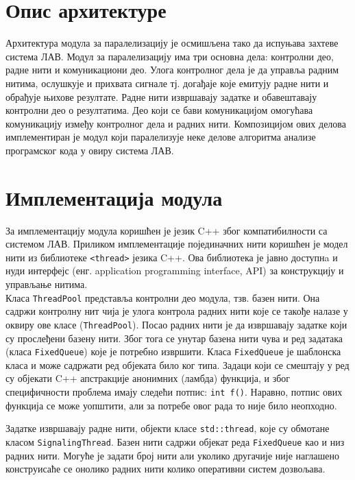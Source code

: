 \documentclass[12pt,oneside]{memoir}
\begin{document}
\section{Опис архитектуре}

Архитектура модула за паралелизацију је осмишљена тако да испуњава захтеве система ЛАВ. Модул за паралелизацију има три основна дела: контролни део, радне нити и комуникациони део. Улога контролног дела је да управља радним нитима, ослушкује и прихвата сигнале тј. догађаје које емитују радне нити и обрађује 	њихове резултате. Радне нити извршавају задатке и обавештавају контролни део о резултатима. Део који се бави комуникацијом омогућава комуникацију између контролног дела и радних нити. Композицијом ових делова имплементиран је модул који паралелизује неке делове алгоритма анализе програмског кода у овиру система ЛАВ.
\newpage

\section{Имплементација модула}
За имплементацију модула коришћен је језик C++ због компатибилности са системом ЛАВ. Приликом имплементације појединачних нити коришћен је модел нити из библиотеке \texttt{<thread>} језика C++. Ова библиотека је јавно доступнa и нуди интерфејс (енг. application programming interface, API) за конструкцију и управљање нитима.
\\ \indent 
Класа \texttt{ThreadPool} представља контролни део модула, тзв. базен нити. Она садржи контролну нит чија је улога контрола радних нити које се такође налазе у оквиру ове класе (\texttt{ThreadPool}). Посао радних нити је да извршавају задатке који су прослеђени базену нити. Због тога се унутар базена нити чува и ред задатака (класа \texttt{FixedQueue}) које је потребно извршити. Класа \texttt{FixedQueue} је шаблонска класа и може садржати ред објеката било ког типа. Задаци који се смештају у ред су објекати C++ апстракције анонимних (ламбда) функција, и због специфичности проблема имају следећи потпис: \texttt{int f()}. Наравно, потпис ових функција се може уопштити, али за потребе овог рада то није било неопходно. 

 Задатке извршавају радне нити, објекти класе \texttt{std::thread}, које су обмотане класом \texttt{SignalingThread}.
Базен нити садржи објекат реда \texttt{FixedQueue} као и низ радних нити. Могуће је задати број нити али уколико другачије није наглашено конструисаће се онолико радних нити колико оперативни систем дозвољава.
\end{document}
